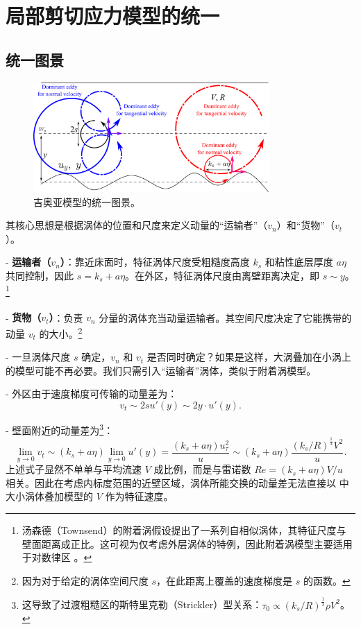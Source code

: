 \documentclass[10pt]{article}
\newcommand{\his}{\textsuperscript{\ddag}}
\begin{document}
\section{局部剪切应力模型的统一}
\subsection{统一图景}
\begin{figure}[htpb]
    \centering
    \includegraphics[width=0.8\textwidth]{./figures/unify-gioia-model.pdf}
    \caption{吉奥亚模型的统一图景。}
    \label{fig:-figures-unify-gioia-model-pdf}
\end{figure}
其核心思想是根据涡体的位置和尺度来定义动量的“运输者”（$v_n$）和“货物”（$v_t$）。

    
- \textbf{运输者（$v_n$）}：靠近床面时，特征涡体尺度受粗糙度高度 $k_s$ 和粘性底层厚度 $a\eta$ 共同控制，因此 $s = k_s + a\eta$\ddag。在外区，特征涡体尺度由离壁距离决定，即 $s\sim y$。\footnote{汤森德（Townsend）的附着涡假设提出了一系列自相似涡体，其特征尺度与壁面距离成正比。这可视为仅考虑外层涡体的特例，因此附着涡模型主要适用于对数律区 \cite{aemmarusic2019}。}
    
- \textbf{货物（$v_t$）\his}：负责 $v_n$ 分量的涡体充当动量运输者。其空间尺度决定了它能携带的动量 $v_t$ 的大小。\footnote{因为对于给定的涡体空间尺度 $s$，在此距离上覆盖的速度梯度是 $s$ 的函数。}
        
            
- 一旦涡体尺度 $s$ 确定，$v_n$ 和 $v_t$ 是否同时确定？如果是这样，大涡叠加在小涡上的模型可能不再必要。我们只需引入“运输者”涡体，类似于附着涡模型。
            
- 外区由于速度梯度可传输的动量差为：
            $$v_t \sim 2s u'(y) \sim 2y \cdot u'(y).$$
            
- 壁面附近的动量差\his 为\footnote{这导致了过渡粗糙区的斯特里克勒（Strickler）型关系：$\tau_0 \propto \left( k_s / R \right) ^{\frac{1}{3}} \rho V^2 $。}：
            $$\lim_{y \to 0} v_t \sim \left( k_s + a\eta \right) \lim_{y \to 0} u'(y) =  \frac{(k_s + a \eta)u_{\tau}^2}{
u} \sim (k_s + a\eta) \frac{\left( k_s / R \right)^{\frac{1}{3}} V^2}{
u}.$$
            上述式子显然不单单与平均流速 $V$ 成比例，而是与雷诺数 $Re = \left( k_s + a\eta \right) V / 
u$ 相关。因此在考虑内标度范围的近壁区域，涡体所能交换的动量差无法直接以 \citet{gioiaprl2001} 中大小涡体叠加模型的 $V$ 作为特征速度。
        
\end{document}
